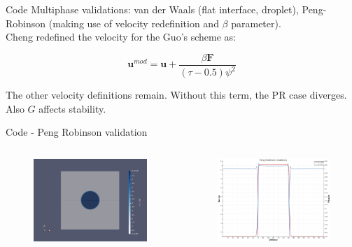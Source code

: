 \documentclass{beamer}
\begin{document}
	\begin{frame}{Code}
		Multiphase validations: van der Waals (flat interface, droplet), Peng-Robinson (making use of velocity redefinition and $\beta$ parameter).\\
		Cheng redefined the velocity for the Guo's scheme as:
		
		\begin{equation}
			\mathbf{u}^{mod} = \mathbf{u} + \frac{\beta \mathbf{F}}{(\tau - 0.5)\psi^2}
		\end{equation}
		
		The other velocity definitions remain. Without this term, the PR case diverges. Also $G$ affects stability.
		
	\end{frame}
	
	\begin{frame}{Code - Peng Robinson validation}
		\begin{columns}
			\begin{figure}
				\centering
				\includegraphics[scale=0.12]{pics/prDroplet1C.png}
				\caption{}   
			\end{figure}
			\begin{figure}
				\centering
				\includegraphics[scale=0.15]{pics/prDroplet1C_2.png}
			\end{figure}
		\end{columns}
	\end{frame}
	
\end{document}

